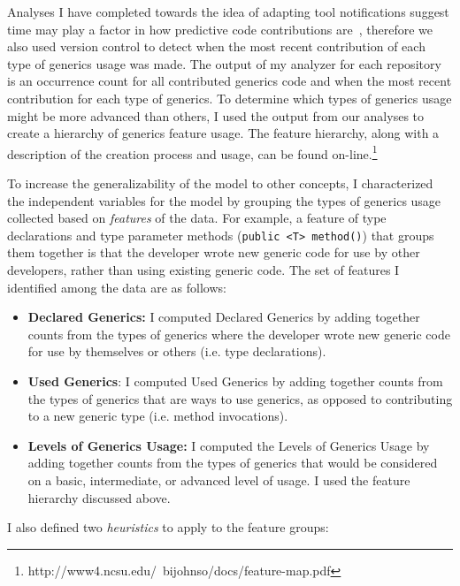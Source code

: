 \documentclass{llncs}
\begin{document}
Analyses I have completed towards the idea of adapting tool notifications suggest time may play a factor in how predictive code contributions are~\cite{johnson2015bespoke}, therefore we also used version control to detect when the most recent contribution of each type of generics usage was made.
The output of my analyzer for each repository is an occurrence count for all contributed generics code and when the most recent contribution for each type of generics.
To determine which types of generics usage might be more advanced than others, I used the output from our analyses to create a hierarchy of generics feature usage. The feature hierarchy, along with a description of the creation process and usage, can be found on-line.\footnote{http://www4.ncsu.edu/~bijohnso/docs/feature-map.pdf}

To increase the generalizability of the model to other concepts, I characterized the independent variables for the model by grouping the types of generics usage collected based on \emph{features} of the data. For example, a feature of type declarations and type parameter methods (\texttt{public <T> method()}) that groups them together is that the developer wrote new generic code for use by other developers, rather than using existing generic code.
The set of features I identified among the data are as follows:
\begin{itemize}
	\item \textbf{Declared Generics:} I computed Declared Generics by adding together counts from the types of generics where the developer wrote new generic code for use by themselves or others (i.e. type declarations).
	\item \textbf{Used Generics}: I computed Used Generics by adding together counts from the types of generics that are ways to use generics, as opposed to contributing to a new generic type (i.e. method invocations).
	\item \textbf{Levels of Generics Usage:} I computed the Levels of Generics Usage by adding together counts from the types of generics that would be considered on a basic, intermediate, or advanced level of usage. I used the feature hierarchy discussed above. 
\end{itemize}

\noindent I also defined two \emph{heuristics} to apply to the feature groups:
\end{document}
